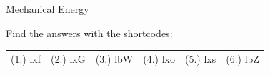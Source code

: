 \begin{eocexercises}{Mechanical Energy}
  \label{m38786**end}
  \label{1fc5ba69690764517c30802fdf7b1905**end}
\par {} Find the answers with the shortcodes:
 \par \begin{tabular}[h]{cccccc}
 (1.) lxf  &  (2.) lxG  &  (3.) lbW  &  (4.) lxo  &  (5.) lxs  &  (6.) lbZ  & \end{tabular}
\end{eocexercises}
